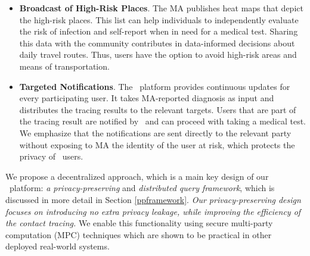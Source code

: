 
\begin{itemize}
    \item \textbf{Broadcast of High-Risk Places}. The MA publishes heat maps that depict the high-risk places. %
    This list can help individuals to independently evaluate the risk of infection and self-report when in need for a medical test. Sharing this data with the community contributes in data-informed decisions about daily travel routes. Thus, users have the option to avoid high-risk areas and means of transportation. 
    \item \textbf{Targeted Notifications}. The \sysname\ platform provides continuous updates for every participating user. It takes MA-reported diagnosis as input and distributes the tracing results to the relevant targets. Users that are part of the tracing result are notified by \sysname\ and can proceed with taking a medical test. We emphasize that the notifications are sent directly to the relevant party without exposing to MA the identity of the user at risk, which protects the privacy of \sysname\ users.
\end{itemize}

We propose a decentralized approach, which is a main key design of our \sysname\ platform: \emph{a privacy-preserving} and \emph{distributed query framework}, which is discussed in more detail in Section \ref{ppframework}. 
\emph{Our privacy-preserving design focuses on introducing no extra privacy leakage, while improving the efficiency of the contact tracing.} 
We enable this functionality using secure multi-party computation (MPC) techniques which are shown to be practical in other deployed real-world systems.

